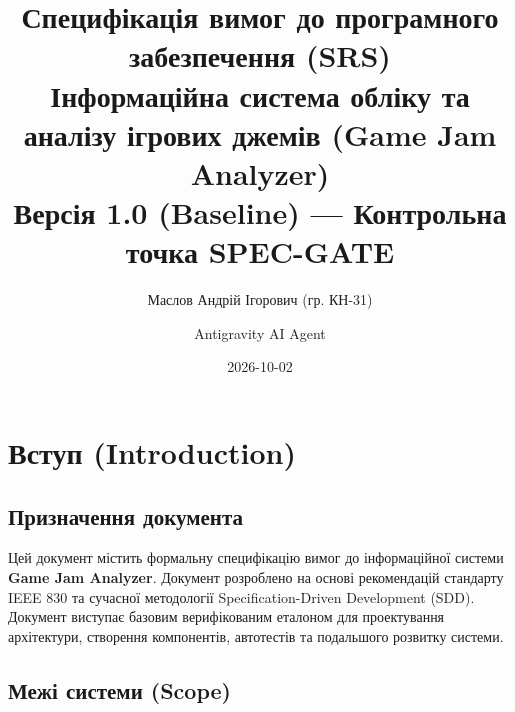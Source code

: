 \documentclass[12pt,a4paper]{article}
\title{\textbf{Специфікація вимог до програмного забезпечення (SRS)}\\
\large Інформаційна система обліку та аналізу ігрових джемів (Game Jam Analyzer)\\\small Версія 1.0 (Baseline) --- Контрольна точка SPEC-GATE}
\author{Маслов Андрій Ігорович (гр. КН-31) \and Antigravity AI Agent}
\date{2026-10-02}
\begin{document}
\maketitle
\tableofcontents
\newpage

\section{Вступ (Introduction)}
\subsection{Призначення документа}
Цей документ містить формальну специфікацію вимог до інформаційної системи \textbf{Game Jam Analyzer}. Документ розроблено на основі рекомендацій стандарту IEEE 830 та сучасної методології Specification-Driven Development (SDD). Документ виступає базовим верифікованим еталоном для проектування архітектури, створення компонентів, автотестів та подальшого розвитку системи.

\subsection{Межі системи (Scope)}
\end{document}

